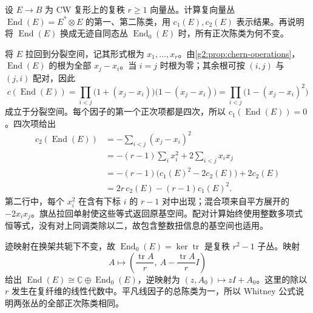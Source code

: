 \begin{exercise}\label{g2:ex:endomorphism-chern-low-classes}
	设 \(E\to B\) 为 CW 复形上的复秩 \(r\ge1\) 向量丛。计算复向量丛 \(\operatorname{End}(E)=E^*\otimes E\) 的第一、第二陈类，用 \(c_1(E),c_2(E)\) 表示结果。再说明将 \(\operatorname{End}(E)\) 换成无迹自同态丛 \(\operatorname{End}_0(E)\) 时，所有正次陈类为何不变。
\end{exercise}
\begin{solution}
	将 \(E\) 拉回到分裂空间，记其形式根为 \(x_1,\ldots,x_r\)。由\cref{g2:prop:chern-operations}，\(\operatorname{End}(E)\) 的根为全部 \(x_j-x_i\)。当 \(i=j\) 时根为零；其余根可按 \((i,j)\) 与 \((j,i)\) 配对，因此
	\[
		c(\operatorname{End}(E))
		=\prod_{i<j}\bigl(1+(x_j-x_i)\bigr)\bigl(1-(x_j-x_i)\bigr)
		=\prod_{i<j}\bigl(1-(x_j-x_i)^2\bigr)
	\]
	成立于分裂空间。每个因子的第一个正次项都是四次，所以 \(c_1(\operatorname{End}(E))=0\)。四次项给出
	\[
	\begin{aligned}
		c_2(\operatorname{End}(E))
		&=-\sum_{i<j}(x_j-x_i)^2\\
		&=-(r-1)\sum_i x_i^2+2\sum_{i<j}x_ix_j\\
		&=-(r-1)\bigl(c_1(E)^2-2c_2(E)\bigr)+2c_2(E)\\
		&=2r\,c_2(E)-(r-1)c_1(E)^2.
	\end{aligned}
	\]
	第二行中，每个 \(x_i^2\) 在含有下标 \(i\) 的 \(r-1\) 对中出现；混合项来自平方展开的 \(-2x_ix_j\)。旗丛拉回单射使这些等式返回原基空间。配对计算始终使用整数多项式恒等式，没有对上同调类除以二，故包含整数扭信息的基空间也适用。

	迹映射在换架共轭下不变，故 \(\operatorname{End}_0(E)=\ker\operatorname{tr}\) 是复秩 \(r^2-1\) 子丛。映射
	\[
		A\longmapsto\left(\frac{\operatorname{tr}A}{r},\ A-\frac{\operatorname{tr}A}{r}I\right)
	\]
	给出 \(\operatorname{End}(E)\cong\underline{\mathbb C}\oplus\operatorname{End}_0(E)\)，逆映射为 \((z,A_0)\mapsto zI+A_0\)。这里的除以 \(r\) 发生在复纤维的线性代数中。平凡线因子的总陈类为一，所以 Whitney 公式说明两张丛的全部正次陈类相同。
\end{solution}


